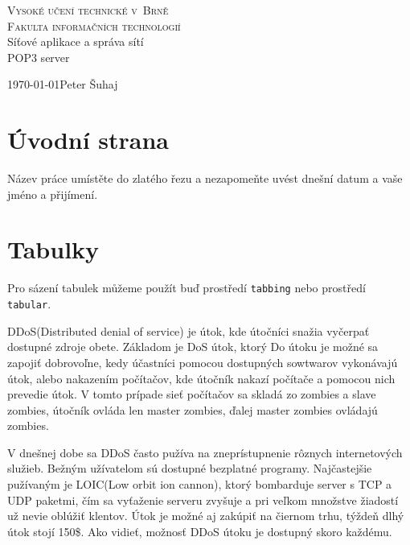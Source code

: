 \documentclass[11pt,a4paper]{article}
\begin{document}
\begin{titlepage}
\begin{center}
	\thispagestyle{empty}
	\textsc{\Huge Vysoké učení technické v~Brně\\[0.4em]
			\huge Fakulta informačních technologií}\\
	{\LARGE 
	Síťové aplikace a správa sítí\\[0.4em]
	\Huge 
	POP3 server}
\end{center}
{\LARGE \today \hfill Peter Šuhaj}
\end{titlepage}	

\setlength{\parskip}{0pt}

{\hypersetup{hidelinks}\tableofcontents}

\setlength{\parskip}{0pt}

\newpage

\section{Úvodní strana}

Název práce umístěte do zlatého řezu a nezapomeňte uvést dnešní datum a vaše jméno a přijímení.

\section{Tabulky}

Pro sázení tabulek můžeme použít buď prostředí \texttt{tabbing} nebo prostředí \texttt{tabular}.


DDoS(Distributed denial of service) je útok, kde útočníci snažia vyčerpať dostupné zdroje obete. Základom je DoS útok, ktorý Do útoku je možné sa zapojiť dobrovoľne, kedy účastníci pomocou dostupných sowtwarov vykonávajú útok, alebo nakazením počítačov, kde útočník nakazí počítače a pomocou nich prevedie útok. V tomto prípade sieť počítačov sa skladá zo zombies a slave zombies, útočník ovláda len master zombies, ďalej master zombies ovládajú zombies\cite{cstugWeb}. 

V dnešnej dobe sa DDoS často pužíva na zneprístupnenie rôznych internetových služieb. Bežným užívatelom sú dostupné bezplatné programy. Najčastejšie pužívaným je LOIC(Low orbit ion cannon), ktorý bombarduje server s TCP a UDP paketmi\cite{Rybicka}, čím sa vyťaženie serveru zvyšuje a pri veľkom množstve žiadostí už nevie oblúžiť klentov. Útok je možné aj zakúpiť na čiernom trhu, týždeň dlhý útok stojí 150\$\cite{Eikh}. Ako vidieť, možnosť DDoS útoku je dostupný skoro každému.
\end{document}
